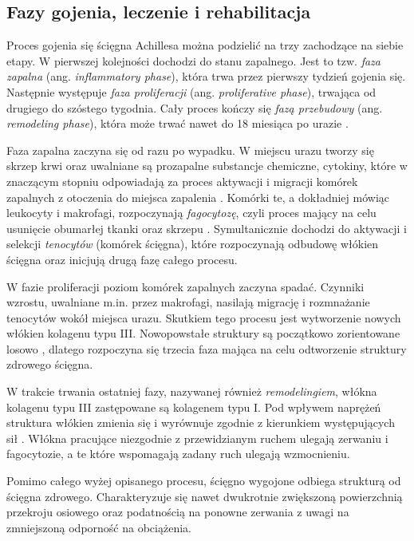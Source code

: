 \subsection{Fazy gojenia, leczenie i rehabilitacja}
\label{gojenie}

Proces gojenia się ścięgna Achillesa można podzielić na trzy zachodzące na siebie etapy. W pierwszej kolejności dochodzi do stanu zapalnego. Jest to tzw. \textit{faza zapalna} (ang. \textit{inflammatory phase}), która trwa przez pierwszy tydzień gojenia się. Następnie występuje \textit{faza proliferacji} (ang. \textit{proliferative phase}), trwająca od drugiego do szóstego tygodnia. Cały proces kończy się \textit{fazą przebudowy} (ang. \textit{remodeling phase}), która może trwać nawet do 18 miesiąca po urazie \cite{Sharma2006, Yang2013, Docheva2015, CMC}. 

Faza zapalna zaczyna się od razu po wypadku. W miejscu urazu tworzy się skrzep krwi oraz uwalniane są prozapalne substancje chemiczne, cytokiny, które w znaczącym stopniu odpowiadają za proces aktywacji i migracji komórek zapalnych z otoczenia do miejsca zapalenia \cite{Lin2004}. Komórki te, a dokładniej mówiąc leukocyty i makrofagi, rozpoczynają \textit{fagocytozę}, czyli proces mający na celu usunięcie obumarłej tkanki oraz skrzepu \cite{Yang2013, Beredjiklian2003, Lin2004}. Symultanicznie dochodzi do aktywacji i selekcji \textit{tenocytów} (komórek ścięgna), które rozpoczynają odbudowę włókien ścięgna \cite{Yang2013} oraz inicjują drugą fazę całego procesu.

W fazie proliferacji poziom komórek zapalnych zaczyna spadać. Czynniki wzrostu, uwalniane m.in. przez makrofagi, nasilają migrację i rozmnażanie tenocytów wokół miejsca urazu. Skutkiem tego procesu jest wytworzenie nowych włókien kolagenu typu III. Nowopowstałe struktury są początkowo zorientowane losowo \cite{Yang2013, Beredjiklian2003, Docheva2015}, dlatego rozpoczyna się trzecia faza mająca na celu odtworzenie struktury zdrowego ścięgna.

W trakcie trwania ostatniej fazy, nazywanej również \textit{remodelingiem}, włókna kolagenu typu III zastępowane są kolagenem typu I. Pod wpływem naprężeń struktura włókien zmienia się i wyrównuje zgodnie z kierunkiem występujących sił \cite{Yang2013}. Włókna pracujące niezgodnie z przewidzianym ruchem ulegają zerwaniu i fagocytozie, a te które wspomagają zadany ruch ulegają wzmocnieniu. 

Pomimo całego wyżej opisanego procesu, ścięgno wygojone odbiega strukturą od ścięgna zdrowego. Charakteryzuje się nawet dwukrotnie zwiększoną powierzchnią przekroju osiowego oraz podatnością na ponowne zerwania z uwagi na zmniejszoną odporność na obciążenia. 

